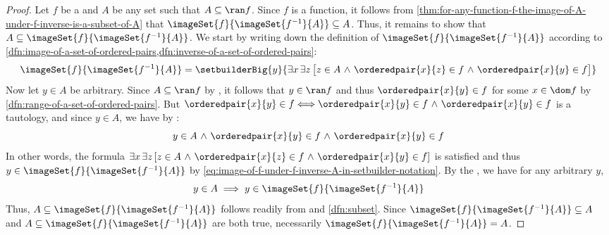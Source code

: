 \begin{proof}
    Let \( f \) be a  and \( A \) be any set such that \( A \subseteq \ran f \).
    Since \( f \) is a function, it follows from \cref{thm:for-any-function-f-the-image-of-A-under-f-inverse-is-a-subset-of-A} that
    \( \imageSet{f}{\imageSet{f^{-1}}{A}} \subseteq A \). Thus, it remains to show that \( A \subseteq \imageSet{f}{\imageSet{f^{-1}}{A}} \).
    We start by writing down the definition of \( \imageSet{f}{\imageSet{f^{-1}}{A}} \)
    according to \cref{dfn:image-of-a-set-of-ordered-pairs,dfn:inverse-of-a-set-of-ordered-pairs}:
    \begin{equation}
        \label{eq:image-of-f-under-f-inverse-A-in-setbuilder-notation}
        \imageSet{f}{\imageSet{f^{-1}}{A}} = \setbuilderBig{y}{\exists x \, \exists z \, \big[ z \in A \,\,{\land}\,\, \orderedpair{x}{z} \in f
        \,\,{\land}\,\, \orderedpair{x}{y} \in f \big]}
    \end{equation}
    Now let \( y \in A \) be arbitrary. Since \( A \subseteq \ran f \) by , it follows that
    \( y \in \ran f \) and thus \( \orderedpair{x}{y} \in f \) for some \( x \in \dom f \) by \cref{dfn:range-of-a-set-of-ordered-pairs}.
    But \( \orderedpair{x}{y} \in f {\iff} \orderedpair{x}{y} \in f \,\,{\land}\,\, \orderedpair{x}{y} \in f \) is a tautology, and since
    \( y \in A \), we have by :
    \begin{equation*}
        y \in A \,\,{\land}\,\, \orderedpair{x}{y} \in f \,\,{\land}\,\, \orderedpair{x}{y} \in f
    \end{equation*}
    In other words, the formula \( \exists x \, \exists z \, \mleft[ z \in A \,\,{\land}\,\, \orderedpair{x}{z} \in f \,\,{\land}\,\, \orderedpair{x}{y} \in f \mright] \)
    is satisfied and thus \( y \in \imageSet{f}{\imageSet{f^{-1}}{A}} \) by \eqref{eq:image-of-f-under-f-inverse-A-in-setbuilder-notation}.
    By the , we have for any arbitrary \( y \),
    \begin{equation*}
        y \in A \implies y \in \imageSet{f}{\imageSet{f^{-1}}{A}}
    \end{equation*}
    Thus, \( A \subseteq \imageSet{f}{\imageSet{f^{-1}}{A}} \) follows readily from
     and \cref{dfn:subset}.
    Since \( \imageSet{f}{\imageSet{f^{-1}}{A}} \subseteq A \) and \( A \subseteq \imageSet{f}{\imageSet{f^{-1}}{A}} \) are both true,
    necessarily \( \imageSet{f}{\imageSet{f^{-1}}{A}} = A \).
\end{proof}

